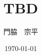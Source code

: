 \documentclass[uplatex, a4paper, 12pt]{jsarticle}
\begin{document}
\title{TBD} %
\author{門脇　宗平}
\date{\today}
\maketitle







\end{document}
